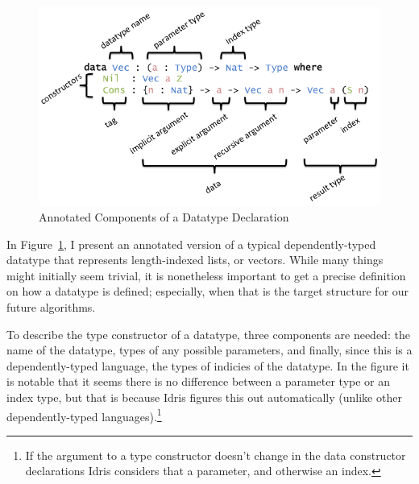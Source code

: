 \documentclass{ituthesis}
\begin{document}
\begin{figure}[ht]
\begin{center}
    \includegraphics[scale=0.5]{Figures/AnatomyOfADatatype.png}
\end{center}
\caption{Annotated Components of a Datatype Declaration}
\label{fig:anatomydatatype}
\end{figure}

In Figure~\ref{fig:anatomydatatype}, I present an annotated version of a typical dependently-typed datatype that represents length-indexed lists, or vectors. While many things might initially seem trivial, it is nonetheless important to get a precise definition
on how a datatype is defined; especially, when that is the target structure for our future algorithms.

To describe the type constructor of a datatype, three components are needed: the name of the datatype, types of any possible parameters, and finally, since this is a dependently-typed language, the types of indicies of the datatype. In the figure it is notable that it seems there is no difference between a parameter type or an index type, but that is because
Idris figures this out automatically (unlike other dependently-typed languages).\footnote{If the argument to a type constructor doesn't change in the data constructor declarations Idris considers that a parameter, and otherwise an index.}
\end{document}
